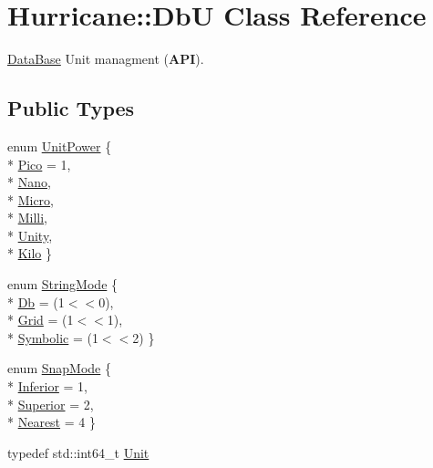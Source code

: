 \hypertarget{classHurricane_1_1DbU}{\section{Hurricane\-:\-:Db\-U Class Reference}
\label{classHurricane_1_1DbU}
}


\hyperlink{classHurricane_1_1DataBase}{Data\-Base} Unit managment ({\bfseries A\-P\-I}).  


\subsection*{Public Types}
\begin{DoxyCompactItemize}
\item 
enum \hyperlink{group__DbUGroup_ga50b5785bf4d75026c4c112caec3040a7}{Unit\-Power} \{ \\*
\hyperlink{group__DbUGroup_gga50b5785bf4d75026c4c112caec3040a7a3cf34ad82faf73a9b48dcb3a621d0557}{Pico} = 1, 
\\*
\hyperlink{group__DbUGroup_gga50b5785bf4d75026c4c112caec3040a7a03e5923be5810db830626f2ca26319d6}{Nano}, 
\\*
\hyperlink{group__DbUGroup_gga50b5785bf4d75026c4c112caec3040a7aa0481a3398a6cbb0a68a523146f0a7fb}{Micro}, 
\\*
\hyperlink{group__DbUGroup_gga50b5785bf4d75026c4c112caec3040a7aac2973886c68f16ee68a192154ea65be}{Milli}, 
\\*
\hyperlink{group__DbUGroup_gga50b5785bf4d75026c4c112caec3040a7ac5c524bb7247124f3dce7d1dbdc7d2c6}{Unity}, 
\\*
\hyperlink{group__DbUGroup_gga50b5785bf4d75026c4c112caec3040a7a7853e18601786b5c51a1bc9cfaf8bb74}{Kilo}
 \}
\item 
enum \hyperlink{group__DbUGroup_ga6af6a5b8d113a661fea65b2bcb8b25c4}{String\-Mode} \{ \\*
\hyperlink{group__DbUGroup_gga6af6a5b8d113a661fea65b2bcb8b25c4a1b91af5faf467afcb73dec10bc54f233}{Db} = (1$<$$<$0), 
\\*
\hyperlink{group__DbUGroup_gga6af6a5b8d113a661fea65b2bcb8b25c4ac6b6574b2ef79ee4e44c6c00fe757c7c}{Grid} = (1$<$$<$1), 
\\*
\hyperlink{group__DbUGroup_gga6af6a5b8d113a661fea65b2bcb8b25c4a16f8df0900c42b001f0a91475a1b93f8}{Symbolic} = (1$<$$<$2)
 \}
\item 
enum \hyperlink{group__DbUGroup_ga1082168d6f9956ebba22ab8bbec21637}{Snap\-Mode} \{ \\*
\hyperlink{group__DbUGroup_gga1082168d6f9956ebba22ab8bbec21637a888eae532f84c3f19b024e1830ef8cb3}{Inferior} = 1, 
\\*
\hyperlink{group__DbUGroup_gga1082168d6f9956ebba22ab8bbec21637a8ce92cf7ff7627c46baf85612f9ad847}{Superior} = 2, 
\\*
\hyperlink{group__DbUGroup_gga1082168d6f9956ebba22ab8bbec21637a65e6f47eb16779b8974a80d6145a2db5}{Nearest} = 4
 \}
\item 
typedef std\-::int64\-\_\-t \hyperlink{group__DbUGroup_ga4fbfa3e8c89347af76c9628ea06c4146}{Unit}
\end{DoxyCompactItemize}
